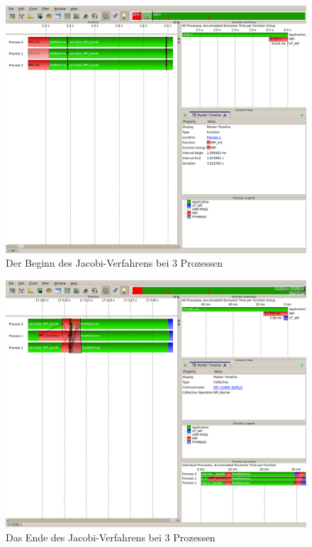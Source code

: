 \documentclass[a4paper,12pt]{scrartcl}
\begin{document}
\begin{figure}[hr!]
 \includegraphics[scale=0.45]{./3_2_JA/Start.png}
 \caption{Der Beginn des Jacobi-Verfahrens bei 3 Prozessen}
\end{figure}
\begin{figure}[hr!]
 \includegraphics[scale=0.45]{./3_2_JA/End.png}
 \caption{Das Ende des Jacobi-Verfahrens bei 3 Prozessen}
\end{figure}
\end{document}
